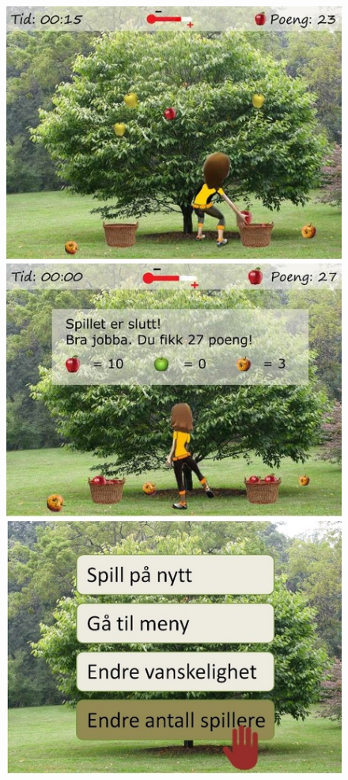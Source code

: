 \begin{figure} [H]
\centering
\includegraphics[scale=0.45]{menuStep3.jpg}
\label{app:menu3Norsk}
\end{figure}

